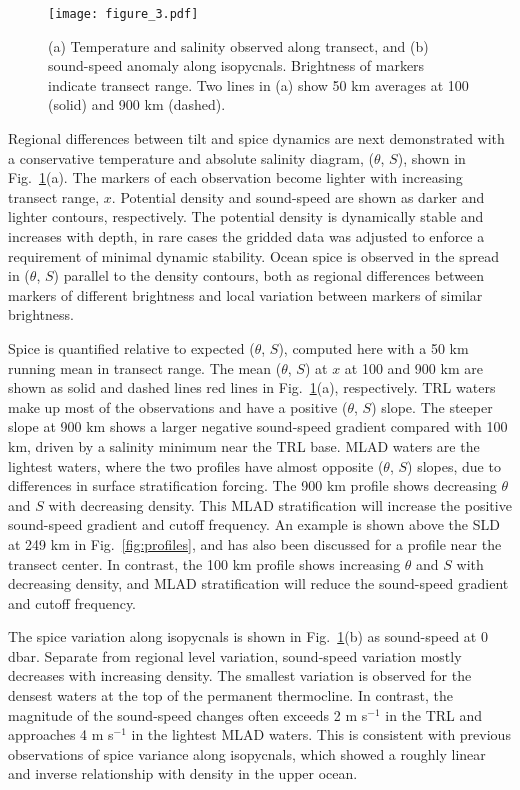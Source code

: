 \documentclass[preprint,NumberedRefs]{JASA}
\begin{document}
\begin{figure}
\texttt{[image: figure\_3.pdf]}
    \caption{\label{fig:ts_diagram}{(a) Temperature and salinity observed along transect, and (b) sound-speed anomaly along isopycnals. Brightness of markers indicate transect range. Two lines in (a) show 50 km averages at 100 (solid) and 900 km (dashed).}}
\end{figure}
Regional differences between tilt and spice dynamics are next demonstrated with a conservative temperature and absolute salinity diagram,\cite{TEOS10} ($\theta$, $S$), shown in Fig.~\ref{fig:ts_diagram}(a). The markers of each observation become lighter with increasing transect range, $x$. Potential density and sound-speed are shown as darker and lighter contours, respectively. The potential density is dynamically stable and increases with depth, in rare cases the gridded data was adjusted to enforce a requirement of minimal dynamic stability.\citep{barker2017stabilizing} Ocean spice is observed in the spread in ($\theta$, $S$) parallel to the density contours, both as regional differences between markers of different brightness and local variation between markers of similar brightness.

Spice is quantified relative to expected ($\theta$, $S$), computed here with a 50 km running mean in transect range. The mean ($\theta$, $S$) at $x$ at 100 and 900 km are shown as solid and dashed lines red lines in Fig.~\ref{fig:ts_diagram}(a), respectively. TRL waters make up most of the observations and have a positive ($\theta$, $S$) slope. The steeper slope at 900 km shows a larger negative sound-speed gradient compared with 100 km, driven by a salinity minimum near the TRL base. MLAD waters are the lightest waters, where the two profiles have almost opposite ($\theta$, $S$) slopes, due to differences in surface stratification forcing.\cite{colosi2020observations} The 900 km profile shows decreasing $\theta$ and $S$ with decreasing density. This MLAD stratification will increase the positive sound-speed gradient and cutoff frequency. An example is shown above the SLD at 249 km in Fig.~\ref{fig:profiles}, and has also been discussed for a profile near the transect center.\cite{colosi2020observations} In contrast, the 100 km profile shows increasing $\theta$ and $S$ with decreasing density, and MLAD stratification will reduce the sound-speed gradient and cutoff frequency.

The spice variation along isopycnals is shown in Fig.~\ref{fig:ts_diagram}(b) as sound-speed at 0 dbar. Separate from regional level variation, sound-speed variation mostly decreases with increasing density. The smallest variation is observed for the densest waters at the top of the permanent thermocline.\cite{cole2010seasonal} In contrast, the magnitude of the sound-speed changes often exceeds 2 m s$^{-1}$ in the TRL and approaches 4 m s$^{-1}$ in the lightest MLAD waters. This is consistent with previous observations of spice variance along isopycnals, which showed a roughly linear and inverse relationship with density in the upper ocean.\cite{ferrari2000}
\end{document}
